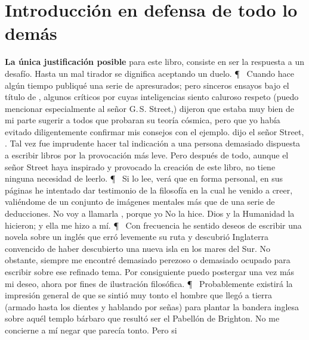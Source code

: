 \chapter{Introducción en defensa de todo lo demás}%
\label{cha:Introducción en defensa de todo lo demás}

\textbf{La única justificación posible} para este libro, consiste en ser la respuesta a un desafío. Hasta un mal
tirador se dignifica aceptando un duelo.
\P~
Cuando hace algún tiempo publiqué una serie de apresurados; pero sinceros ensayos bajo el título
de , algunos críticos por cuyas inteligencias siento caluroso respeto (puedo mencionar
especialmente al señor G.\,S. Street,) dijeron que estaba muy bien de mi parte sugerir a todos que probaran
su teoría cósmica, pero que yo había evitado diligentemente confirmar mis consejos con el ejemplo.  dijo el señor Street, . Tal vez fue imprudente hacer tal indicación a una persona demasiado dispuesta a
escribir libros por la provocación más leve. Pero después de todo, aunque el señor Street haya inspirado y
provocado la creación de este libro, no tiene ninguna necesidad de leerlo.
\P~
Si lo lee, verá que en forma personal, en sus páginas he intentado dar testimonio de la filosofía en la
cual he venido a creer, valiéndome de un conjunto de imágenes mentales más que de una serie de
deducciones. No voy a llamarla , porque yo No la hice. Dios y la Humanidad la hicieron; y
ella me hizo a mí.
\P~
Con frecuencia he sentido deseos de escribir una novela sobre un  inglés que erró
levemente su ruta y descubrió Inglaterra convencido de haber descubierto una nueva isla en los mares del
Sur. No obstante, siempre me encontré demasiado perezoso o demasiado ocupado para escribir sobre ese
refinado tema. Por consiguiente puedo postergar una vez más mi deseo, ahora por fines de ilustración
filosófica.
\P~
Probablemente existirá la impresión general de que se sintió muy tonto el hombre que llegó a tierra
(armado hasta los dientes y hablando por señas) para plantar la bandera inglesa sobre aquél templo
bárbaro que resultó ser el Pabellón de Brighton. No me concierne a mí negar que parecía tonto. Pero si
